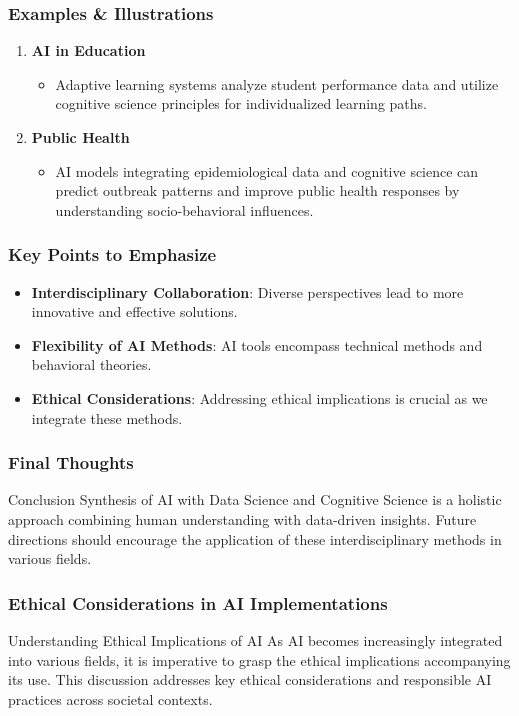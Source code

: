 \documentclass[aspectratio=169]{beamer}
\begin{document}
\begin{frame}[fragile]
    \frametitle{Examples & Illustrations}
    \begin{enumerate}
        \item \textbf{AI in Education}
        \begin{itemize}
            \item Adaptive learning systems analyze student performance data and utilize cognitive science principles for individualized learning paths.
        \end{itemize}
        
        \item \textbf{Public Health}
        \begin{itemize}
            \item AI models integrating epidemiological data and cognitive science can predict outbreak patterns and improve public health responses by understanding socio-behavioral influences.
        \end{itemize}
    \end{enumerate}
\end{frame}

\begin{frame}[fragile]
    \frametitle{Key Points to Emphasize}
    \begin{itemize}
        \item \textbf{Interdisciplinary Collaboration}: Diverse perspectives lead to more innovative and effective solutions.
        \item \textbf{Flexibility of AI Methods}: AI tools encompass technical methods and behavioral theories.
        \item \textbf{Ethical Considerations}: Addressing ethical implications is crucial as we integrate these methods.
    \end{itemize}
\end{frame}

\begin{frame}[fragile]
    \frametitle{Final Thoughts}
    \begin{block}{Conclusion}
        Synthesis of AI with Data Science and Cognitive Science is a holistic approach combining human understanding with data-driven insights. Future directions should encourage the application of these interdisciplinary methods in various fields.
    \end{block}
\end{frame}

\begin{frame}[fragile]
    \frametitle{Ethical Considerations in AI Implementations}
    \begin{block}{Understanding Ethical Implications of AI}
        As AI becomes increasingly integrated into various fields, it is imperative to grasp the ethical implications accompanying its use. This discussion addresses key ethical considerations and responsible AI practices across societal contexts.
    \end{block}
\end{frame}
\end{document}
